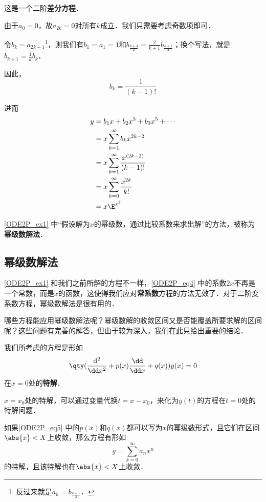 \begin{example}{}
这是一个二阶\textbf{差分方程}．

由于$a_0=0$，故$a_{2k}=0$对所有$k$成立．我们只需要考虑奇数项即可．

令$b_k=a_{2k-1}$\footnote{反过来就是$a_k=b_{\frac{k+1}{2}}$．}，则我们有$b_1=a_1=1$和$b_{\frac{k+3}{2}}=\frac{2}{k+1}b_{\frac{k+1}{2}}$；换个写法，就是$b_{k+1}=\frac{1}{k}b_k$．

因此，
\begin{equation}
b_k=\frac{1}{(k-1)!}
\end{equation}

进而
\begin{equation}\label{ODE2P_eq6}
\begin{aligned}
y&=b_1x+b_2x^3+b_3x^5+\cdots\\
 &=x\sum\limits_{k=1}^\infty b_kx^{2k-2}\\
 &=x\sum\limits_{k=1}^\infty \frac{x^{(2k-2)}}{(k-1)!}\\
 &=x\sum\limits_{k=0}^\infty \frac{x^{2k}}{k!}\\
 &=x\E^{x^2} 
\end{aligned}
\end{equation}

\end{example}

\autoref{ODE2P_ex1} 中“假设解为$x$的幂级数，通过比较系数来求出解”的方法，被称为\textbf{幂级数解法}．


\subsection{幂级数解法}

\autoref{ODE2P_ex1} 和我们之前所解的方程不一样，\autoref{ODE2P_eq4} 中的系数$2x$不再是一个常数，而是$x$的函数，这使得我们应对\textbf{常系数}方程的方法无效了．对于二阶变系数方程，幂级数解法是很有用的．

哪些方程能应用幂级数解法呢？幂级数解的收敛区间又是否能覆盖所要求解的区间呢？这些问题有完善的解答，但由于较为深入，我们在此只给出重要的结论．

我们所考虑的方程是形如
\begin{equation}\label{ODE2P_eq5}
\qty(\frac{\mathrm{d}^2}{\dd x^2}+p(x)\frac{\dd}{\dd x}+q(x))y(x)=0
\end{equation}
在$x=0$处的\textbf{特解}．

$x=x_0$处的特解，可以通过变量代换$t=x-x_0$，来化为$y(t)$的方程在$t=0$处的特解问题．

\begin{theorem}{}\label{ODE2P_the2}
如果\autoref{ODE2P_eq5} 中的$p(x)$和$q(x)$都可以写为$x$的幂级数形式，且它们在区间$\abs{x}<X$上收敛，那么方程有形如
\begin{equation}
y=\sum\limits_{k=0}^\infty a_nx^n
\end{equation}
的特解，且该特解也在$\abs{x}<X$上收敛．
\end{theorem}

